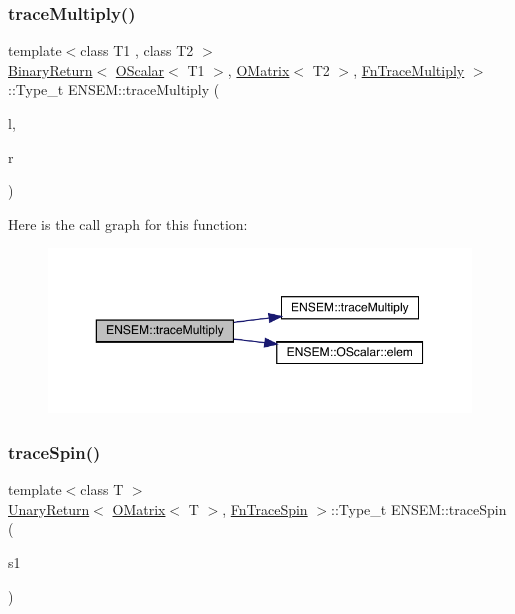 \subsubsection{\texorpdfstring{traceMultiply()}{traceMultiply()}\hspace{0.1cm}{\footnotesize\ttfamily [3/3]}}
{\footnotesize\ttfamily template$<$class T1 , class T2 $>$ \\
\mbox{\hyperlink{structENSEM_1_1BinaryReturn}{Binary\+Return}}$<$ \mbox{\hyperlink{classENSEM_1_1OScalar}{O\+Scalar}}$<$ T1 $>$, \mbox{\hyperlink{classENSEM_1_1OMatrix}{O\+Matrix}}$<$ T2 $>$, \mbox{\hyperlink{structENSEM_1_1FnTraceMultiply}{Fn\+Trace\+Multiply}} $>$\+::Type\+\_\+t E\+N\+S\+E\+M\+::trace\+Multiply (\begin{DoxyParamCaption}\item[{const \mbox{\hyperlink{classENSEM_1_1OScalar}{O\+Scalar}}$<$ T1 $>$ \&}]{l,  }\item[{const \mbox{\hyperlink{classENSEM_1_1OMatrix}{O\+Matrix}}$<$ T2 $>$ \&}]{r }\end{DoxyParamCaption})\hspace{0.3cm}{\ttfamily [inline]}}

Here is the call graph for this function\+:\nopagebreak
\begin{figure}[H]
\begin{center}
\leavevmode
\includegraphics[width=350pt]{d8/d55/group__obsmatrix_gab9e4e0bccae4aa80554908fd966782e1_cgraph}
\end{center}
\end{figure}
\mbox{\label{group__obsmatrix_gae311225b718ade4433fe82a01a290d63}} 
\subsubsection{\texorpdfstring{traceSpin()}{traceSpin()}}
{\footnotesize\ttfamily template$<$class T $>$ \\
\mbox{\hyperlink{structENSEM_1_1UnaryReturn}{Unary\+Return}}$<$ \mbox{\hyperlink{classENSEM_1_1OMatrix}{O\+Matrix}}$<$ T $>$, \mbox{\hyperlink{structENSEM_1_1FnTraceSpin}{Fn\+Trace\+Spin}} $>$\+::Type\+\_\+t E\+N\+S\+E\+M\+::trace\+Spin (\begin{DoxyParamCaption}\item[{const \mbox{\hyperlink{classENSEM_1_1OMatrix}{O\+Matrix}}$<$ T $>$ \&}]{s1 }\end{DoxyParamCaption})\hspace{0.3cm}{\ttfamily [inline]}}

